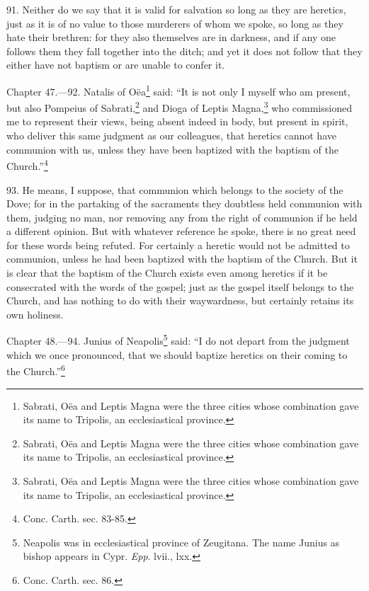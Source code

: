 91. Neither do we say that it is valid for salvation so long as they are heretics, just as it is of no value to those murderers of whom we spoke, so long as they hate their brethren: for they also themselves are in darkness, and if any one follows them they fall together into the ditch; and yet it does not follow that they either have not baptism or are unable to confer it.


Chapter 47.—92. Natalis of Oëa\footnote{\par  Sabrati, Oëa and Leptis Magna were the three cities whose combination gave its name to Tripolis, an ecclesiastical province.} said: ``It is not only I myself who am present, but also Pompeius of Sabrati,\footnote{\par  Sabrati, Oëa and Leptis Magna were the three cities whose combination gave its name to Tripolis, an ecclesiastical province.} and Dioga of Leptis Magna,\footnote{\par  Sabrati, Oëa and Leptis Magna were the three cities whose combination gave its name to Tripolis, an ecclesiastical province.} who commissioned me to represent their views, being absent indeed in body, but present in spirit, who deliver this same judgment as our colleagues, that heretics cannot have communion with us, unless they have been baptized with the baptism of the Church.''\footnote{\par  Conc. Carth. sec. 83-85.}

93. He means, I suppose, that communion which belongs to the society of the Dove; for in the partaking of the sacraments they doubtless held communion with them, judging no man, nor removing any from the right of communion if he held a different opinion. But with whatever reference he spoke, there is no great need for these words being refuted. For certainly a heretic would not be admitted to communion, unless he had been baptized with the baptism of the Church. But it is clear that the baptism of the Church exists even among heretics if it be consecrated with the words of the gospel; just as the gospel itself belongs to the Church, and has nothing to do with their waywardness, but certainly retains its own holiness.


Chapter 48.—94. Junius of Neapolis\footnote{\par  Neapolis was in ecclesiastical province of Zeugitana. The name Junius as bishop appears in Cypr. \emph{Epp}. lvii., lxx.} said: ``I do not depart from the judgment which we once pronounced, that we should baptize heretics on their coming to the Church.''\footnote{\par  Conc. Carth. sec. 86.}

